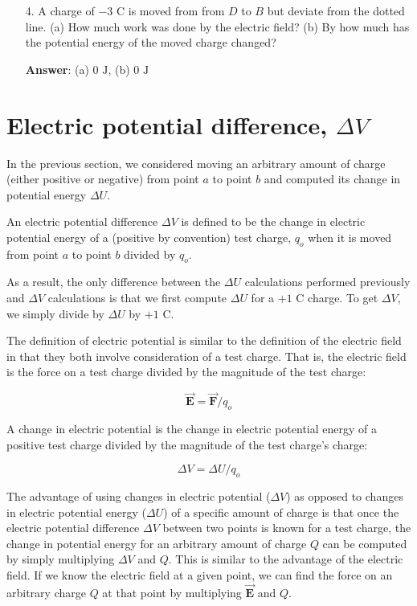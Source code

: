 \documentclass{article}
\newcommand{\bfvec}[1]{\vec{\mathbf{#1}}}
\begin{document}
\vskip 48pt
\fi

\begin{enumerate}

  \item[4.] A charge of $-3\text{ C}$ is moved from from $D$ to $B$ but deviate from the dotted line. (a) How much work was done by the electric field? (b) By how much has the potential energy of the moved charge changed?

            \ifsolutions
            {\bf Answer}: (a) $0\text{ J}$, (b) $0\text{ J}$
            \fi

\end{enumerate}

\newpage

\section{Electric potential difference, $\Delta V$}

In the previous section, we considered moving an arbitrary amount of charge (either positive or negative) from point $a$ to point $b$ and computed its change in potential energy $\Delta U$.

An electric potential difference $\Delta V$ is defined to be the change in electric potential energy of a (positive by convention) test charge, $q_o$ when it is moved from point $a$ to point $b$ divided by $q_o$.

As a result, the only difference between the $\Delta U$ calculations performed previously and $\Delta V$ calculations is that we first compute $\Delta U$ for a $+1\text{ C}$ charge. To get $\Delta V$, we simply divide by $\Delta U$ by $+1\text{ C}$.

The definition of electric potential is similar to the definition of the electric field in that they both involve consideration of a test charge. That is, the electric field is the force on a test charge divided by the magnitude of the test charge:

$$\bfvec{E} = {\bfvec{F}}/{q_o}$$

A change in electric potential is the change in electric potential energy of a positive test charge divided by the magnitude of the test charge's charge:

$$\Delta V = {\Delta U}/{q_o}$$

The advantage of using changes in electric potential ($\Delta V$) as opposed to changes in electric potential energy ($\Delta U$) of a specific amount of charge is that once the electric potential difference $\Delta V$ between two points is known for a test charge, the change in potential energy for an arbitrary amount of charge $Q$ can be computed by simply multiplying $\Delta V$ and $Q$. This is similar to the advantage of the electric field. If we know the electric field at a given point, we can find the force on an arbitrary charge $Q$ at that point by multiplying $\bfvec{E}$ and $Q$.
\end{document}
